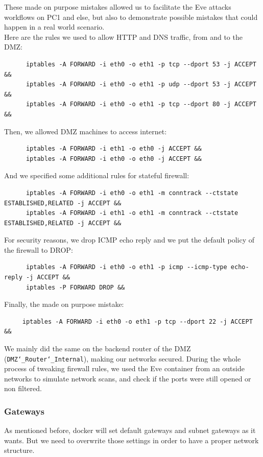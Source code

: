 \documentclass[a4paper,11pt,singlespacing]{article}
\begin{document}
These made on purpose mistakes allowed us to facilitate the Eve attacks workflows on PC1 and else, but also to demonstrate possible mistakes that could happen in a real world scenario.\\

Here are the rules we used to allow HTTP and DNS traffic, from and to the DMZ:
\begin{lstlisting}
      iptables -A FORWARD -i eth0 -o eth1 -p tcp --dport 53 -j ACCEPT &&
      iptables -A FORWARD -i eth0 -o eth1 -p udp --dport 53 -j ACCEPT &&
      iptables -A FORWARD -i eth0 -o eth1 -p tcp --dport 80 -j ACCEPT &&
\end{lstlisting}

Then, we allowed DMZ machines to access internet:
\begin{lstlisting}
      iptables -A FORWARD -i eth1 -o eth0 -j ACCEPT &&
      iptables -A FORWARD -i eth0 -o eth0 -j ACCEPT &&
\end{lstlisting}

And we specified some additional rules for stateful firewall:
\begin{lstlisting}
      iptables -A FORWARD -i eth0 -o eth1 -m conntrack --ctstate ESTABLISHED,RELATED -j ACCEPT &&
      iptables -A FORWARD -i eth1 -o eth1 -m conntrack --ctstate ESTABLISHED,RELATED -j ACCEPT &&
\end{lstlisting}

For security reasons, we drop ICMP echo reply and we put the default policy of the firewall to DROP:
\begin{lstlisting}
      iptables -A FORWARD -i eth0 -o eth1 -p icmp --icmp-type echo-reply -j ACCEPT &&
      iptables -P FORWARD DROP &&    
\end{lstlisting}

Finally, the made on purpose mistake:
\begin{lstlisting}
     iptables -A FORWARD -i eth0 -o eth1 -p tcp --dport 22 -j ACCEPT &&
\end{lstlisting}

We mainly did the same on the backend router of the DMZ (\texttt{DMZ\char`_Router\char`_Internal}), making our networks secured. During the whole process of tweaking firewall rules, we used the Eve container from an outside networks to simulate network scans, and check if the ports were still opened or non filtered.


\subsubsection{Gateways}
As mentioned before, docker will set default gateways and subnet gateways as it wants. But we need to overwrite those settings in order to have a proper network structure.
\end{document}
